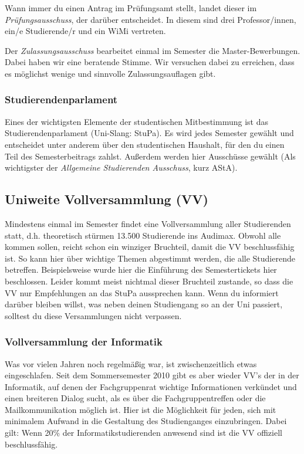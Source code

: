 		Wann immer du einen Antrag im Prüfungsamt stellt, landet
		dieser im \emph{Prüfungsausschuss}, der darüber
		entscheidet. In diesem sind drei Professor/innen, ein/e Studierende/r und ein WiMi vertreten.

		Der \emph{Zulassungsausschuss} bearbeitet einmal im
		Semester die Master-Bewerbungen. Dabei haben wir eine
		beratende Stimme. Wir versuchen dabei zu erreichen,
		dass es möglichst wenige  und sinnvolle Zulassungsauflagen gibt.

	\subsubsection*{Studierendenparlament}
		Eines der wichtigsten Elemente der studentischen
		Mitbestimmung ist das Studierendenparlament (Uni-Slang:
		StuPa). Es wird jedes Semester gewählt und entscheidet
		unter anderem über den studentischen Haushalt, für den
		du einen Teil des Semesterbeitrags zahlst. Außerdem werden hier Ausschüsse gewählt (Als wichtigster der \emph{Allgemeine Studierenden Ausschuss}, kurz AStA).
	\subsection*{Uniweite Vollversammlung (VV)}
		Mindestens einmal im Semester findet eine
		Vollversammlung aller Studierenden statt, d.h. theoretisch
		stürmen 13.500 Studierende ins Audimax. Obwohl alle kommen
		sollen, reicht schon ein winziger Bruchteil, damit
		die VV beschlussfähig ist. So kann hier über wichtige
		Themen abgestimmt werden, die alle Studierende betreffen.
		Beispielsweise wurde hier die Einführung des Semestertickets
		hier beschlossen. Leider kommt meist nichtmal dieser
		Bruchteil zustande, so dass die VV  nur Empfehlungen
		an das StuPa aussprechen kann. Wenn du informiert darüber 
		bleiben willst, was neben deinen Studiengang so an der
		Uni passiert, solltest du diese Versammlungen nicht verpassen.

		\subsubsection*{Vollversammlung der Informatik}
			Was vor vielen Jahren noch regelmäßig war, ist
			zwischenzeitlich etwas eingeschlafen. Seit dem
			Sommersemester 2010 gibt es aber wieder VV's der
			in der Informatik, auf denen der
			Fachgruppenrat
			wichtige Informationen verkündet und einen
			breiteren Dialog sucht, als es über die
			Fachgruppentreffen oder die Mailkommunikation
			möglich ist. Hier ist die Möglichkeit für jeden,
			sich mit minimalem Aufwand in die Gestaltung des
			Studienganges einzubringen. Dabei gilt: Wenn
			20\% der Informatikstudierenden anwesend sind  ist die VV offiziell beschlussfähig.
